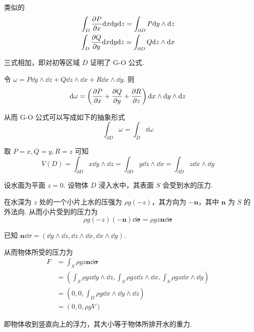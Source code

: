 类似的
$$
\begin{aligned}
    \int_D\frac{\partial{P}}{\partial{x}}\mathrm{d} x\mathrm{d} y\mathrm{d} z=\int_{\partial D}P\mathrm{d} y\wedge\mathrm{d} z\\
    \int_D\frac{\partial{Q}}{\partial{y}}\mathrm{d} x\mathrm{d} y\mathrm{d} z=\int_{\partial D}Q\mathrm{d} z\wedge\mathrm{d} x
\end{aligned}
$$

三式相加，即对初等区域 $D$ 证明了 G-O 公式.

\begin{hint}
    令 $\omega=P\dd y\wedge\dd z+Q\dd z\wedge\dd x+R\dd x\wedge\dd y$. 则
$$
\mathrm{d}\omega=\left(\frac{\partial{P}}{\partial{x}}+\frac{\partial{Q}}{\partial{y}}+\frac{\partial{R}}{\partial{z}}\right)\mathrm{d} x\wedge\mathrm{d} y\wedge\mathrm{d} z
$$

    从而 G-O 公式可以写成如下的抽象形式
$$
\int_{\partial D}\omega=\int_{\overline{D}}\dd\omega
$$
\end{hint}

\begin{example}
    取 $P=x,Q=y,R=z$ 可知
$$
V(D)=\int_{\partial D}x\dd y\wedge\dd z=\int_{\partial D}y\dd z\wedge\dd x=\int_{\partial D}z\dd x\wedge\dd y
$$
\end{example}

\begin{example}[ 椭球的体积]
\end{example}

\begin{example}
    设水面为平面 $z=0$. 设物体 $D$ 浸入水中，其表面 $S$ 会受到水的压力.


    在水深为 $z$ 处的一个小片上水的压强为 $\rho g(-z)$，其方向为 $-\mathbf{n}$，其中 $\mathbf{n}$ 为 $S$ 的外法向. 从而小片受到的压力为
$$
\rho g(-z)(-\mathbf{n})\dd\bm{\sigma}=\rho gz\mathbf{n}\dd\bm{\sigma}
$$

    已知 $\mathbf{n}\dd\sigma=(\dd y\wedge\dd z,\dd z\wedge\dd x,\dd x\wedge\dd y)$.

    从而物体所受的压力为
$$
\begin{aligned}
    F&=\int_S\rho g z\mathbf{n}\dd\bm{\sigma}\\
    &=\left(\int_S\rho g z\dd y\wedge\dd z,\int_S\rho g z\dd z\wedge\dd x,\int_S\rho g z\dd x\wedge\dd y\right)\\
    &=\left(0,0,\int_D\rho g\dd x\wedge\dd y\wedge\dd z\right)\\
    &=(0,0,\rho g V)
\end{aligned}
$$

    即物体收到竖直向上的浮力，其大小等于物体所排开水的重力.
\end{example}

